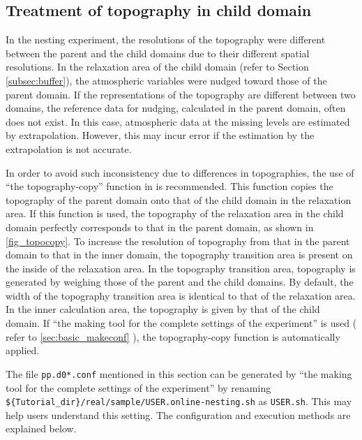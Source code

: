 \subsection{Treatment of topography in child domain} \label{subsec:nest_topo}
In the nesting experiment, the resolutions of the topography were different between the parent and the child domains due to their different spatial resolutions. In the relaxation area of the child domain (refer to Section \ref{subsec:buffer}), the atmospheric variables were nudged toward those of the parent domain. If the representations of the topography are different between two domains, the reference data for nudging, calculated in the parent domain, often does not exist. In this case, atmospheric data at the missing levels are estimated by extrapolation. However, this may incur error if the estimation by the extrapolation is not accurate.

In order to avoid such inconsistency due to differences in topographies, the use of ``the topography-copy'' function in \scalerm is recommended. This function copies the topography of the parent domain onto that of the child domain in the relaxation area. If this function is used, the topography of the relaxation area in the child domain perfectly corresponds to that in the parent domain, as shown in \ref{fig_topocopy}. To increase the resolution of topography from that in the parent domain to that in the inner domain, the topography transition area is present on the inside of the relaxation area. In the topography transition area, topography is generated by weighing those of the parent and the child domains. By default, the width of the topography transition area is identical to that of the relaxation area. In the inner calculation area, the topography is given by that of the child domain. If ``the making tool for the complete settings of the experiment'' is used ( refer to \ref{sec:basic_makeconf} ), the topography-copy function is automatically applied.

The file \verb|pp.d0*.conf| mentioned in this section can be generated by  ``the making tool for the complete settings of the experiment'' by renaming \\ \verb|${Tutorial_dir}/real/sample/USER.online-nesting.sh| as \verb|USER.sh|. This may help users understand this setting. The configuration and execution methods are explained below.

